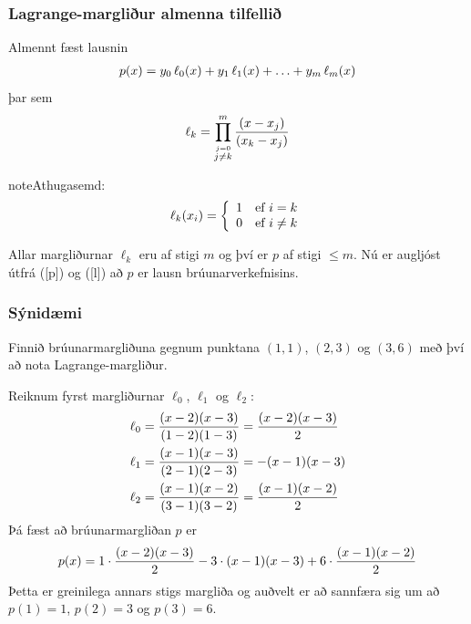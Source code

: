 \documentclass[a4paper,10pt,icelandic]{sphinxmanual}
\begin{document}
\subsubsection{Lagrange-margliður almenna tilfellið}
\label{kafli03:lagrange-margliur-almenna-tilfelli}
Almennt fæst lausnin
\begin{gather}
\begin{split}\label{p}
  p(x) = y_0 \, \ell_{0}(x) + y_1 \, \ell_{1}(x)
  + \ldots + y_m \, \ell_{m}(x)\end{split}\notag
\end{gather}
þar sem
\begin{gather}
\begin{split}\ell_{k} = \prod\limits_{\stackrel{j=0}{j\not=k}}^m
  \frac{(x-x_j)}{(x_k-x_j)}\end{split}\notag
\end{gather}
\begin{notice}{note}{Athugasemd:}\begin{gather}
\begin{split}\label{l}
  \ell_{k}(x_i) = \left\{ \begin{array}{cc}
      1 & \text{ef } i = k \\
      0 & \text{ef } i \not= k
  \end{array} \right.\end{split}\notag
\end{gather}\end{notice}

Allar margliðurnar \(\ell_{k}\) eru af stigi \(m\) og því er
\(p\) af stigi \(\leq m\). Nú er augljóst útfrá ({[}p{]}) og ({[}l{]})
að \(p\) er lausn brúunarverkefnisins.


\subsubsection{Sýnidæmi}
\label{kafli03:synidaemi}
Finnið brúunarmargliðuna gegnum punktana \((1,1)\), \((2,3)\)
og \((3,6)\) með því að nota Lagrange-margliður.

Reiknum fyrst margliðurnar \(\ell_{0}\), \(\ell_{1}\) og
\(\ell_{2}\):
\begin{gather}
\begin{split}\begin{aligned}
  \ell_{0} &= \frac{(x-2)(x-3)}{(1-2)(1-3)}
  = \frac{(x-2)(x-3)}{2} \\
  \ell_{1} &= \frac{(x-1)(x-3)}{(2-1)(2-3)}
  = -(x-1)(x-3) \\
  \ell_{2} &= \frac{(x-1)(x-2)}{(3-1)(3-2)}
  = \frac{(x-1)(x-2)}{2}\end{aligned}\end{split}\notag
\end{gather}
Þá fæst að brúunarmargliðan \(p\) er
\begin{gather}
\begin{split}p(x) = 1 \cdot \frac{(x-2)(x-3)}{2}
  - 3 \cdot (x-1)(x-3)
  + 6 \cdot \frac{(x-1)(x-2)}{2}\end{split}\notag
\end{gather}
Þetta er greinilega annars stigs margliða og auðvelt er að sannfæra sig
um að \(p(1) = 1\), \(p(2) = 3\) og \(p(3) = 6\).
\end{document}
